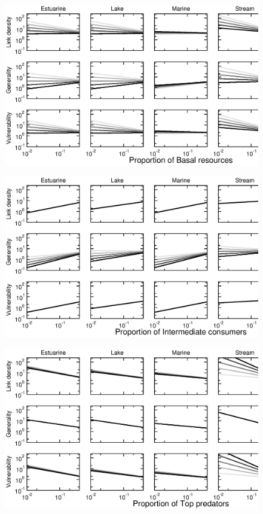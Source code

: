 \documentclass[12pt]{article}
\begin{document}
\begin{figure}[!h]
\label{B}
\includegraphics[width=.9\textwidth]{Figures/by_TL/scaling_with_S/proportions/B_latlines_nonts.eps}
\caption{}
\end{figure}


\begin{figure}[!h]
\label{I}
\includegraphics[width=.9\textwidth]{Figures/by_TL/scaling_with_S/proportions/I_latlines_nonts.eps}
\caption{}
\end{figure}


\begin{figure}[!h]
\label{T}
\includegraphics[width=.9\textwidth]{Figures/by_TL/scaling_with_S/proportions/T_latlines_nonts.eps}
\caption{}
\end{figure}
\end{document}
